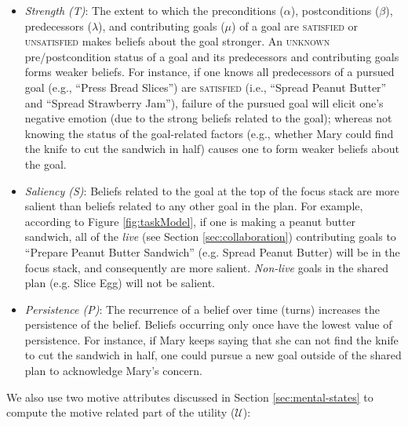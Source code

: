 \documentclass{article}
\begin{document}
\vspace*{-1mm}
\begin{itemize}[leftmargin=2pt]
  \setlength\itemsep{0.2mm}
  \item \textit{Strength (T)}: The extent to which the preconditions ($\alpha$),
  postconditions ($\beta$), predecessors ($\lambda$), and contributing goals
  ($\mu$) of a goal are \textsc{satisfied} or \textsc{unsatisfied} makes beliefs
  about the goal stronger. An \textsc{unknown} pre/postcondition status of a
  goal and its predecessors and contributing goals forms weaker beliefs. For
  instance, if one knows all predecessors of a pursued goal (e.g., ``Press Bread
  Slices'') are \textsc{satisfied} (i.e., ``Spread Peanut Butter'' and ``Spread
  Strawberry Jam''), failure of the pursued goal will elicit one's negative
  emotion (due to the strong beliefs related to the goal); whereas not knowing
  the status of the goal-related factors (e.g., whether Mary could find the
  knife to cut the sandwich in half) causes one to form weaker beliefs about the
  goal.
  \item \textit{Saliency (S)}: Beliefs related to the goal at the top of the
  focus stack are more salient than beliefs related to any other goal in the
  plan. For example, according to Figure \ref{fig:taskModel}, if one is making a
  peanut butter sandwich, all of the \textit{live} (see Section
  \ref{sec:collaboration}) contributing goals to ``Prepare Peanut Butter
  Sandwich'' (e.g. Spread Peanut Butter) will be in the focus stack, and
  consequently are more salient. \textit{Non-live} goals in the shared plan
  (e.g. Slice Egg) will not be salient.
  \item \textit{Persistence (P)}: The recurrence of a belief over time (turns)
  increases the persistence of the belief. Beliefs occurring only once have the
  lowest value of persistence. For instance, if Mary keeps saying that she can
  not find the knife to cut the sandwich in half, one could pursue a new goal
  outside of the shared plan to acknowledge Mary's concern.
\end{itemize}

\noindent We also use two motive attributes discussed in Section
\ref{sec:mental-states} to compute the motive related part of the utility
($\mathcal{U}$):
\end{document}
